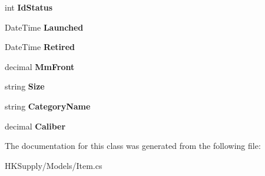 \begin{DoxyCompactItemize}
\item 
\mbox{\label{class_h_k_supply_1_1_models_1_1_item_a5b2558c82ad208d74a3e9aa3b219f966}} 
int {\bfseries Id\+Status}
\item 
\mbox{\label{class_h_k_supply_1_1_models_1_1_item_a44a587a4f0fc7dd728ca2f99419b907e}} 
Date\+Time {\bfseries Launched}
\item 
\mbox{\label{class_h_k_supply_1_1_models_1_1_item_a6daab7e7b48f7b4d2880f1abad0042ad}} 
Date\+Time {\bfseries Retired}
\item 
\mbox{\label{class_h_k_supply_1_1_models_1_1_item_a8fd256c1a39f676d52fb055fee944823}} 
decimal {\bfseries Mm\+Front}
\item 
\mbox{\label{class_h_k_supply_1_1_models_1_1_item_a552d4b2111fc23b1b26309961af2c2bb}} 
string {\bfseries Size}
\item 
\mbox{\label{class_h_k_supply_1_1_models_1_1_item_a35a35380d3abfead601e55a657eab55b}} 
string {\bfseries Category\+Name}
\item 
\mbox{\label{class_h_k_supply_1_1_models_1_1_item_a0bb2c18a90007fbbb47177c1429d8d52}} 
decimal {\bfseries Caliber}
\end{DoxyCompactItemize}


The documentation for this class was generated from the following file\+:\begin{DoxyCompactItemize}
\item 
H\+K\+Supply/\+Models/Item.\+cs\end{DoxyCompactItemize}
